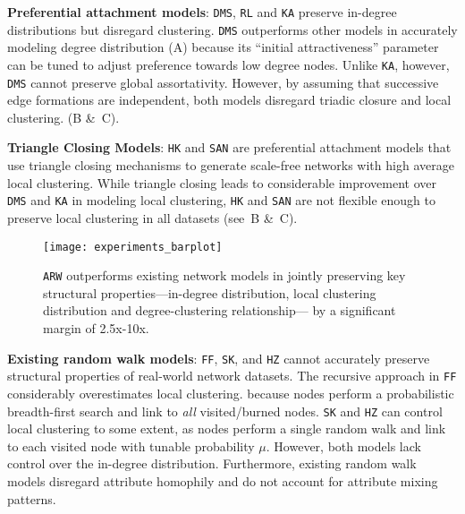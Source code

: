 \textbf{Preferential attachment models}: \texttt{DMS}, \texttt{RL}
and \texttt{KA} preserve in-degree distributions but disregard
clustering. \texttt{DMS} outperforms other models in accurately modeling
degree distribution (A) because its ``initial attractiveness''
parameter can be tuned to adjust preference towards low degree nodes. Unlike \texttt{KA}, however,
\texttt{DMS} cannot preserve global assortativity.
However, by assuming that successive edge formations are independent, both models disregard
triadic closure and local clustering. (B \&~C).

\textbf{Triangle Closing Models}: \texttt{HK} and \texttt{SAN} are preferential attachment models
that use triangle closing mechanisms to generate scale-free networks with high average
local clustering.
While triangle closing leads to considerable improvement over \texttt{DMS}
and \texttt{KA} in modeling local clustering, \texttt{HK} and \texttt{SAN} are not flexible enough
to preserve local clustering in {all} datasets (see~B \&~C).


\begin{figure}[b]
	\caption{\texttt{ARW} outperforms
		existing network models in jointly preserving key structural properties---in-degree
		distribution, local clustering distribution and degree-clustering relationship---
		by a significant margin of 2.5x-10x.
	}
	\centering
	\texttt{[image: experiments\_barplot]}
	\label{fig:barplot}
\end{figure}

\textbf{Existing random walk models}: \texttt{FF}, \texttt{SK}, and \texttt{HZ}
cannot accurately preserve structural properties of real-world network datasets.
The recursive approach in \texttt{FF} considerably overestimates local clustering.
because nodes perform a probabilistic breadth-first search and link to \textit{all} visited/burned
nodes.
\texttt{SK} and \texttt{HZ} can control local clustering to some extent, as
nodes perform a single random walk and link to each visited node with tunable probability $\mu$.
However, both models lack control over the in-degree distribution. Furthermore, existing random walk models
disregard attribute homophily and do not account for attribute mixing patterns.


